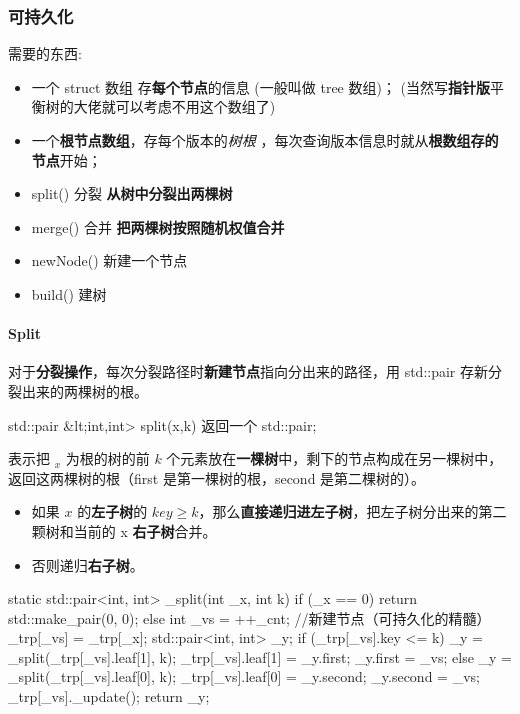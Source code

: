 \subsubsection{可持久化}

需要的东西:

\begin{itemize}
\item 一个 struct 数组 存\textbf{每个节点}的信息 (一般叫做 tree 数组)； (当然写\textbf{指针版}平衡树的大佬就可以考虑不用这个数组了)
\item 一个\textbf{根节点数组}，存每个版本的{\em 树根 }，每次查询版本信息时就从\textbf{根数组存的节点}开始；
\item split() 分裂 \textbf{从树中分裂出两棵树}
\item merge() 合并 \textbf{把两棵树按照随机权值合并}
\item newNode() 新建一个节点
\item build() 建树
\end{itemize}

\paragraph{Split}

对于\textbf{分裂操作}，每次分裂路径时\textbf{新建节点}指向分出来的路径，用 std::pair 存新分裂出来的两棵树的根。

std::pair \&lt;int,int> split(x,k) 返回一个 std::pair;

表示把 $_x$ 为根的树的前 $k$ 个元素放在\textbf{一棵树}中，剩下的节点构成在另一棵树中，返回这两棵树的根（first 是第一棵树的根，second 是第二棵树的）。

\begin{itemize}
\item 如果 $x$ 的\textbf{左子树}的 $key ≥ k$，那么\textbf{直接递归进左子树}，把左子树分出来的第二颗树和当前的 x \textbf{右子树}合并。
\item 否则递归\textbf{右子树}。
\end{itemize}

\begin{cppcode}
static std::pair<int, int> _split(int _x, int k) {
  if (_x == 0)
    return std::make_pair(0, 0);
  else {
    int _vs = ++_cnt;  //新建节点（可持久化的精髓）
    _trp[_vs] = _trp[_x];
    std::pair<int, int> _y;
    if (_trp[_vs].key <= k) {
      _y = _split(_trp[_vs].leaf[1], k);
      _trp[_vs].leaf[1] = _y.first;
      _y.first = _vs;
    } else {
      _y = _split(_trp[_vs].leaf[0], k);
      _trp[_vs].leaf[0] = _y.second;
      _y.second = _vs;
    }
    _trp[_vs]._update();
    return _y;
  }
}
\end{cppcode}

